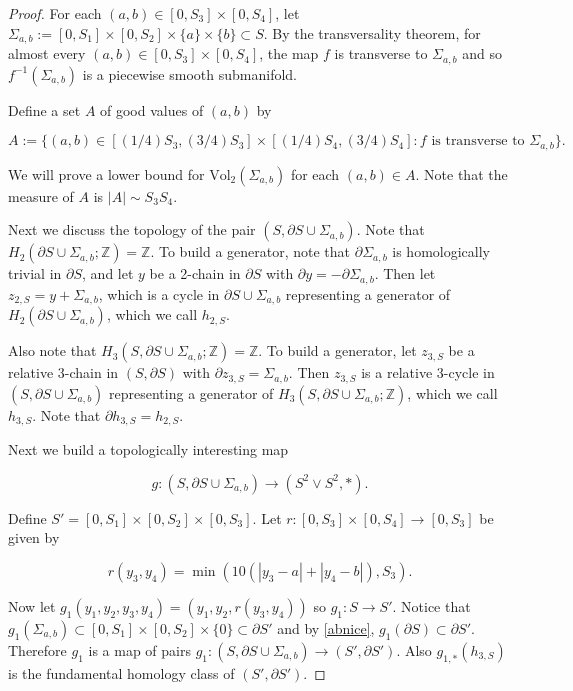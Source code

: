 \documentclass{amsart}
\newtheorem*{theorem 1}{Theorem 1}
\newtheorem*{theorem 2}{Theorem 2}
\newtheorem*{theorem 3}{Theorem 3}
\numberwithin{equation}{section}
\newcommand{\Vol}{\textrm{Vol}}
\newcommand{\ZZ}{\mathbb{Z}}
\begin{document}
\begin{proof}

For each $(a,b) \in [0, S_3] \times [0, S_4]$,  let $\Sigma_{a, b} := [0, S_1] \times [0, S_2] \times \{a \} \times \{ b \} \subset S$.   By the transversality theorem,  for almost every $(a,b) \in  [0, S_3] \times [0, S_4]$,  the map $f$ is transverse to $\Sigma_{a,b}$ and so $f^{-1}(\Sigma_{a,b})$ is a piecewise smooth submanifold.   

Define a set $A$ of good values of $(a,b)$ by

\begin{equation} \label{abnice}  A := \{ (a,b) \in [(1/4) S_3, (3/4) S_3] \times [(1/4) S_4, (3/4) S_4]: f \textrm{ is transverse to } \Sigma_{a,b} \} . \end{equation}  

We will prove a lower bound for $\Vol_2(\Sigma_{a,b})$ for each $(a,b) \in A$.  Note that the measure of $A$ is $|A| \sim S_3 S_4$.  

Next we discuss the topology of the pair $(S,  \partial S \cup \Sigma_{a,b})$.   Note that $H_2(\partial S \cup \Sigma_{a,b}; \ZZ) = \ZZ$.   To build a generator,  note that $\partial \Sigma_{a,b}$ is homologically trivial in $\partial S$,  and let $y$ be a 2-chain in $\partial S$ with $\partial y = - \partial \Sigma_{a,b}$.   Then let $z_{2,  S} = y + \Sigma_{a,b}$,  which is a cycle in $\partial S \cup \Sigma_{a,b}$ representing a generator of $H_2(\partial S \cup \Sigma_{a,b})$,  which we call $h_{2,S}$.   

Also note that $H_3(S,  \partial S \cup \Sigma_{a,b}; \ZZ) = \ZZ$.   To build a generator,  let $z_{3,  S}$ be a relative 3-chain in $(S, \partial S)$ with $\partial z_{3,  S} = \Sigma_{a,b}$.    Then $z_{3,  S}$ is a relative 3-cycle in $(S,  \partial S \cup \Sigma_{a,b})$ representing a generator of $H_3(S,  \partial S \cup \Sigma_{a,b}; \ZZ)$,  which we call $h_{3, S}$.   Note that $\partial h_{3,S} = h_{2,S}$.

Next we build a topologically interesting map

$$ g: (S,  \partial S \cup \Sigma_{a,b} ) \rightarrow (S^2 \vee S^2, *). $$

Define $S' = [0,S_1] \times [0,  S_2] \times [0, S_3]$.    Let $r: [0, S_3] \times [0, S_4] \rightarrow [0, S_3]$ be given by 

$$ r(y_3, y_4) = \min(  10 ( |y_3 - a| + |y_4 - b| ),  S_3 ).  $$

Now let $g_1 (y_1, y_2, y_3, y_4) = (y_1, y_2,  r(y_3, y_4))$ so $g_1: S \rightarrow S'$.    Notice that $g_1(\Sigma_{a,b}) \subset [0,S_1] \times [0, S_2] \times \{0 \} \subset \partial S'$ and by \eqref{abnice},  $g_1(\partial S) \subset \partial S'$.   Therefore $g_1$ is a map of pairs $g_1: (S,  \partial S \cup \Sigma_{a,b}) \rightarrow (S',  \partial S')$.   Also $g_{1, *}(h_{3,S})$ is the fundamental homology class of $(S',  \partial S')$.   


\end{proof}
\end{document}
